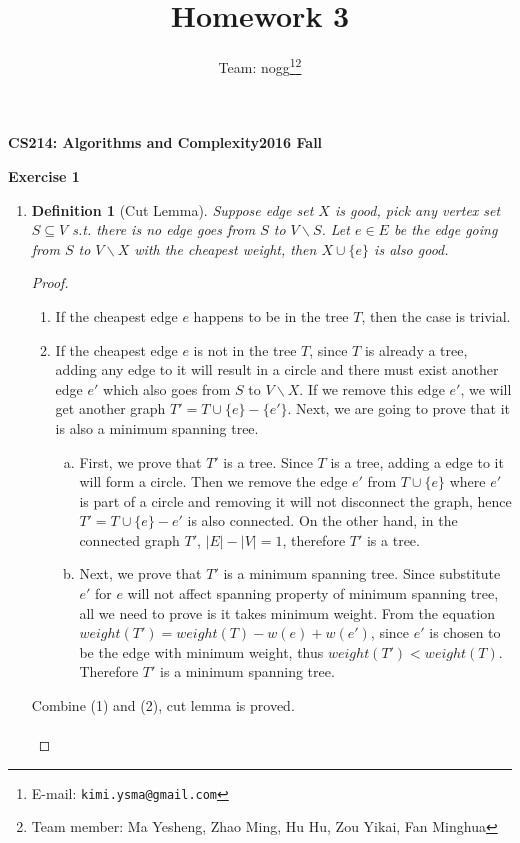 \documentclass[12pt, notitlepage]{article}
\title{Homework 3}
\author{Team: nogg\footnote{E-mail: \texttt{kimi.ysma@gmail.com}}\footnote{Team member: Ma Yesheng, Zhao Ming, Hu Hu, Zou Yikai, Fan Minghua}}
\newtheorem{defi}{Definition}
\begin{document}
{\bf\small CS214: Algorithms and Complexity}\hfill{\bf\small 2016 Fall}
{\let\newpage\relax\maketitle}


\textbf{Exercise 1}
\begin{enumerate}
\item

\begin{defi}[Cut Lemma]
\vspace{-0.85cm}
Suppose edge set $X$ is good, pick any vertex set $S\subseteq V$ s.t. there is no edge goes from $S$ to $V\backslash S$. Let $e\in E$ be the edge going from $S$ to  $V\backslash X$ with the cheapest weight, then $X\cup \{e\}$ is also good.
\end{defi}
\begin{proof}
	\mbox{ }
\begin{enumerate}[(1)]
	\item If the cheapest edge $e$ happens to be in the tree $T$, then the case is trivial.
	\item If the cheapest edge $e$ is not in the tree $T$, since $T$ is already a tree, adding any edge to it will result in a circle and there must exist another edge $e'$ which also goes from $S$ to  $V\backslash X$. If we remove this edge $e'$, we will get another graph $T' = T\cup \{e\} -\{e'\}$. Next, we are going to prove that it is also a minimum spanning tree.
	\begin{enumerate}[(a)]
		\item First, we prove that $T'$ is a tree. Since $T$ is a tree, adding a edge to it will form a circle. Then we remove the  edge $e'$ from $T\cup\{e\}$ where $e'$ is part of a circle and removing it will not disconnect the graph, hence $T' = T\cup\{e\} - e'$ is also connected. On the other hand, in the connected graph $T'$, $|E|-|V| = 1$, therefore $T'$ is a tree.
		\item Next, we prove that $T'$ is a minimum spanning tree. Since substitute $e'$ for $e$ will not affect spanning property of minimum spanning tree, all we need to prove is it takes minimum weight. From the equation $weight(T') = weight(T)-w(e)+w(e')$, since $e'$ is chosen to be the edge with minimum weight, thus $weight(T') < weight(T)$. Therefore $T'$ is a minimum spanning tree.
		
	\end{enumerate}
\end{enumerate}
Combine (1) and (2), cut lemma is proved.\\\\
\end{proof}


\end{enumerate}
\end{document}
